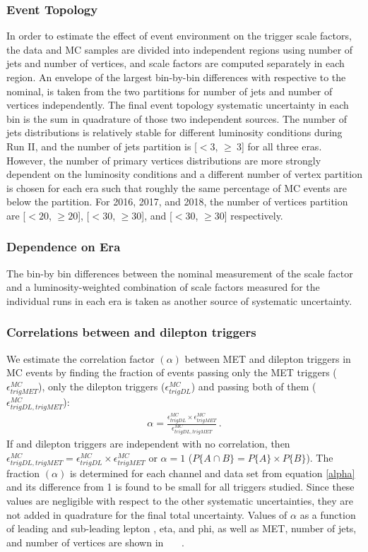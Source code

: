 \subsubsection{Event Topology}
In order to estimate the effect of event environment on the trigger scale factors, the data and MC samples are divided into independent regions using number of jets and number of vertices, and scale factors are computed separately in each region. 
An envelope of the largest bin-by-bin differences with respective to the nominal, is taken from the two partitions for number of jets and number of vertices independently.
The final event topology systematic uncertainty in each bin is the sum in quadrature of those two independent sources.
The number of jets distributions is relatively stable for different luminosity conditions during Run II, and the number of jets partition is [$< 3$, $\geq\ 3$] for all three eras.
However, the number of primary vertices distributions are more strongly dependent on the luminosity conditions and a different number of vertex partition is chosen for each era such that roughly the same percentage of MC events are below the partition.
For 2016, 2017, and 2018, the number of vertices partition are [$< 20$, $\geq 20$], [$< 30$, $\geq 30$], and [$< 30$, $\geq 30$] respectively.
\subsubsection{Dependence on Era}
The bin-by bin differences between the nominal measurement of the scale factor and a luminosity-weighted combination of scale factors measured for the individual runs in each era is taken as another source of systematic uncertainty.
\subsubsection{Correlations between \MET and dilepton triggers}
We estimate the correlation factor $(\alpha)$ between MET and dilepton triggers in \ttbar MC events by finding the fraction of events passing only the MET triggers ($\epsilon_{trigMET}^{MC}$), only the dilepton triggers ($\epsilon_{trigDL}^{MC}$) and passing both of them ($\epsilon_{trigDL,trigMET}^{MC}$): 
\begin{eqnarray}
\alpha=\frac{\epsilon_{trigDL}^{MC} \times \epsilon_{trigMET}^{MC}}{\epsilon_{trigDL,trigMET}^{MC}} \, .
\label{alpha}
\end{eqnarray}
If \MET and dilepton triggers are independent with no correlation, then $\epsilon_{trigDL,trigMET}^{MC} = \epsilon_{trigDL}^{MC} \times \epsilon_{trigMET}^{MC}$ or $\alpha = 1$ ($P\{A\cap B\} = P\{A\} \times P\{B\}$).
The fraction $(\alpha)$ is determined for each channel and data set from equation \ref{alpha} and its difference from 1 is found to be small for all triggers studied. 
Since these values are negligible with respect to the other systematic uncertainties, they are not added in quadrature for the final total uncertainty. 
Values of $\alpha$ as a function of leading and sub-leading lepton \pT, eta, and phi, as well as MET, number of jets, and number of vertices are shown in ~~~. 

